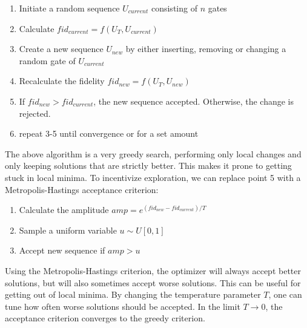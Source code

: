 \documentclass{article}
\begin{document}
\begin{enumerate}
    \item Initiate a random sequence $U_{current}$ consisting of $n$ gates
    \item Calculate $fid_{current} = f(U_T, U_{current})$
    \item Create a new sequence $U_{new}$ by either inserting, removing or changing a random gate of $U_{current}$
    \item Recalculate the fidelity $fid_{new} = f(U_T, U_{new})$
    \item If $fid_{new} > fid_{current}$, the new sequence accepted. Otherwise, the change is rejected.
    \item repeat 3-5 until convergence or for a set amount
\end{enumerate}

The above algorithm is a very greedy search, performing only local changes and only keeping solutions that are strictly better. This makes it prone to getting stuck in local minima. To incentivize exploration, we can replace point 5 with a Metropolis-Hastings acceptance criterion:

\begin{enumerate}
    \item Calculate the amplitude $amp = e^{(fid_{new} - fid_{current})/T}$
    \item Sample a uniform variable $u \sim U[0,1]$
    \item Accept new sequence if $amp > u$
\end{enumerate}

Using the Metropolis-Hastings criterion, the optimizer will always accept better solutions, but will also sometimes accept worse solutions. This can be useful for getting out of local minima. By changing the temperature parameter $T$, one can tune how often worse solutions should be accepted. In the limit $T \rightarrow 0$, the acceptance criterion converges to the greedy criterion.
\end{document}
